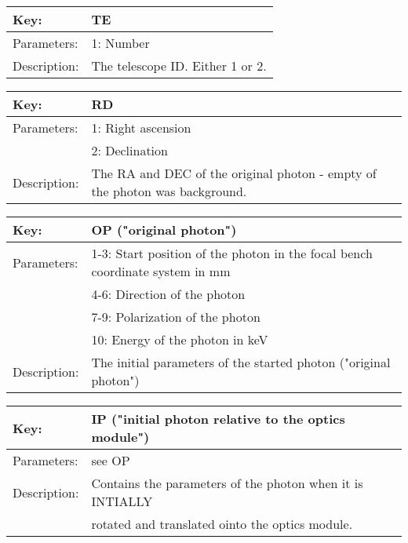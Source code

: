 \begin{table}[htdp]
\begin{center}
\begin{tabular}{|p{2cm}|p{12cm}|}
\hline
Key:&	TE\\
\hline
Parameters:&	1: Number\\
\hline
Description:&	The telescope ID. Either 1 or 2.\\
\hline
\end{tabular}
\end{center}
\end{table}

\begin{table}[htdp]
\begin{center}
\begin{tabular}{|p{2cm}|p{12cm}|}
\hline
Key:&	RD\\
\hline
Parameters:&	1: Right ascension\\
&2: Declination\\
\hline
Description:&	The RA and DEC of the original photon - empty of the photon was background.\\
\hline
\end{tabular}
\end{center}
\end{table}

\begin{table}[htdp]
\begin{center}
\begin{tabular}{|p{2cm}|p{12cm}|}
\hline
Key:&	OP ("original photon") \\
\hline
Parameters:&	1-3: Start position of the photon in the focal bench coordinate system in mm  \\
\hline
&4-6: Direction of the photon\\
&7-9: Polarization of the photon\\
&10: Energy of the photon in keV\\
Description:&	The initial parameters of the started photon ("original photon")\\
\hline
\end{tabular}
\end{center}
\end{table}

\begin{table}[htdp]
\begin{center}
\begin{tabular}{|p{2cm}|p{12cm}|}
\hline
Key:&	IP ("initial photon relative to the optics module")\\
\hline
Parameters:&	see OP\\
\hline
Description:&	Contains the parameters of the photon when it is INTIALLY \\
&rotated and translated ointo the optics module. \\
\hline
\end{tabular}
\end{center}
\end{table}

